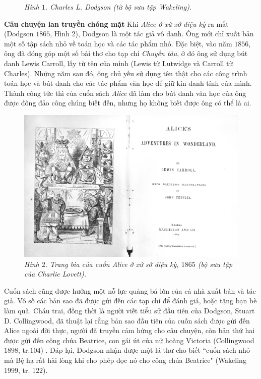 \begin{multicols}{2}
\begin{figure}[H]
		\caption{\small\textit{\color{quantoan}Hình $1$. Charles L. Dodgson (từ bộ sưu tập Wakeling).}}
		\vspace*{-5pt}
	\end{figure}
	\textbf{\color{quantoan}Câu chuyện lan truyền chóng mặt}
	\vskip 0.1cm
	Khi \textit{Alice ở xứ xở diệu kỳ} ra mắt (Dodgson $1865$, Hình $2$), Dodgson là một tác giả vô danh. Ông mới chỉ xuất bản một số tập sách nhỏ về toán học và các tác phẩm nhỏ. Đặc biệt, vào năm $1856$, ông đã đóng góp một số bài thơ cho tạp chí \textit{Chuyến tàu}, ở đó ông sử dụng bút danh Lewis Carroll, lấy từ tên của mình (Lewis từ Lutwidge và Carroll từ Charles). Những năm sau đó, ông chủ yếu sử dụng tên thật cho các công trình toán học và bút danh cho các tác phẩm văn học để giữ kín danh tính của mình. Thành công tức thì của cuốn sách \textit{Alice} đã làm cho bút danh văn học của ông được đông đảo công chúng biết đến, nhưng họ không biết được ông có thể là ai.
	\begin{figure}[H]
		\vspace*{-5pt}
		\centering
		\captionsetup{labelformat= empty, justification=centering}
		\includegraphics[width= 1\linewidth]{2}
		\caption{\small\textit{\color{quantoan}Hình $2$. Trang bìa của cuốn Alice ở xứ sở diệu kỳ, $1865$ (bộ sưu tập của Charlie Lovett).}}
		\vspace*{-10pt}
	\end{figure}
	Cuốn sách cũng được hưởng một nỗ lực quảng bá lớn của cả nhà xuất bản và tác giả. Vô số các bản sao đã được gửi đến các tạp chí để đánh giá, hoặc tặng bạn bè làm quà. Cháu trai, đồng thời là người viết tiểu sử đầu tiên của Dodgson, Stuart D. Collingwood, đã thuật lại rằng bản sao đầu tiên của cuốn sách được gửi đến Alice ngoài đời thực, người đã truyền cảm hứng cho câu chuyện, còn bản thứ hai được gửi đến công chúa Beatrice, con gái út của nữ hoàng Victoria (Collingwood $1898$, tr.$104$) . Đáp lại, Dodgson nhận được một lá thư cho biết ``cuốn sách nhỏ mà Bệ hạ rất hài lòng khi cho phép đọc nó cho công chúa Beatrice" (Wakeling $1999$, tr. $122$).

\end{multicols}

